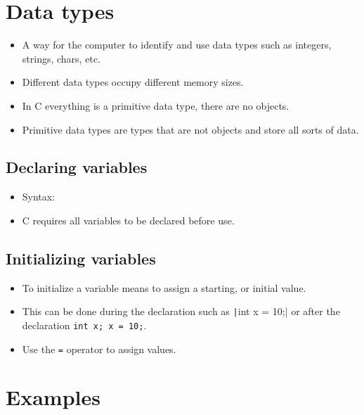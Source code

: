 \section{Data types}
\begin{itemize}
    \item A way for the computer to identify and use data types such as integers, strings, chars, etc.
    \item Different data types occupy different memory sizes. 
    \item In C everything is a primitive data type, there are no objects.
    \item Primitive data types are types that are not objects and store all sorts of data. 
\end{itemize}
\subsection{Declaring variables}
\begin{itemize}
    \item Syntax:  
    \item C requires all variables to be declared before use. 
\end{itemize}
\subsection{Initializing variables}
\begin{itemize}
    \item To initialize a variable means to assign a starting, or initial value.
    \item This can be done during the declaration such as \texttt|int x = 10;| or after the declaration \texttt{int x; x = 10;}.
    \item Use the \texttt{=} operator to assign values. 
\end{itemize}

\section{Examples}


